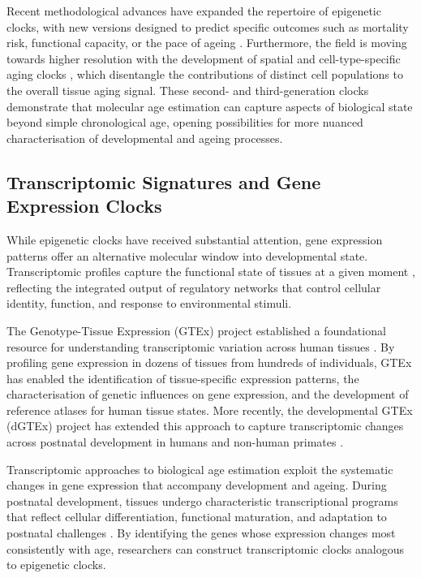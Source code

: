 Recent methodological advances have expanded the repertoire of epigenetic clocks, with new versions designed to predict specific outcomes such as mortality risk, functional capacity, or the pace of ageing \parencite{teschendorff_epigenetic_2025}. Furthermore, the field is moving towards higher resolution with the development of spatial and cell-type-specific aging clocks \parencite{sun_spatial_2025, muralidharan_human_2025}, which disentangle the contributions of distinct cell populations to the overall tissue aging signal. These second- and third-generation clocks demonstrate that molecular age estimation can capture aspects of biological state beyond simple chronological age, opening possibilities for more nuanced characterisation of developmental and ageing processes.

\subsection{Transcriptomic Signatures and Gene Expression Clocks}

While epigenetic clocks have received substantial attention, gene expression patterns offer an alternative molecular window into developmental state. Transcriptomic profiles capture the functional state of tissues at a given moment \parencite{wang_rna-seq_2009}, reflecting the integrated output of regulatory networks that control cellular identity, function, and response to environmental stimuli.

The Genotype-Tissue Expression (GTEx) project established a foundational resource for understanding transcriptomic variation across human tissues \parencite{the_gtex_consortium_gtex_2020}. By profiling gene expression in dozens of tissues from hundreds of individuals, GTEx has enabled the identification of tissue-specific expression patterns, the characterisation of genetic influences on gene expression, and the development of reference atlases for human tissue states. More recently, the developmental GTEx (dGTEx) project has extended this approach to capture transcriptomic changes across postnatal development in humans and non-human primates \parencite{coorens_human_2025}.

Transcriptomic approaches to biological age estimation exploit the systematic changes in gene expression that accompany development and ageing. During postnatal development, tissues undergo characteristic transcriptional programs that reflect cellular differentiation, functional maturation, and adaptation to postnatal challenges \parencite{cardoso-moreira_gene_2019}. By identifying the genes whose expression changes most consistently with age, researchers can construct transcriptomic clocks analogous to epigenetic clocks.

